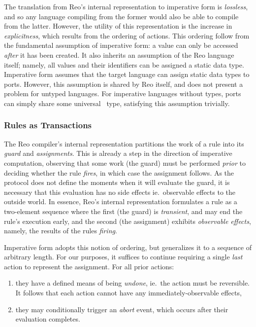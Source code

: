 The translation from Reo's internal representation to imperative form is \textit{lossless}, and so any language compiling from the former would also be able to compile from the latter. However, the utility of this representation is the increase in \textit{explicitness}, which results from the ordering of actions. This ordering follow from the fundamental assumption of imperative form: a value can only be accessed \textit{after} it has been created. It also inherits an assumption of the Reo language itself; namely, all values and their identifiers can be assigned a static data type. Imperative form assumes that the target language can assign static data types to ports. However, this assumption is shared by Reo itself, and does not present a problem for untyped languages. For imperative languages without types, ports can simply share some universal~ type, satisfying this assumption trivially.

\subsubsection{Rules as Transactions}

The Reo compiler's internal representation partitions the work of a rule into its \textit{guard} and \textit{assignments}. This is already a step in the direction of imperative computation, observing that some work (the guard) must be performed \textit{prior} to deciding whether the rule \textit{fires}, in which case the assignment follows. As the protocol does not define the moments when it will evaluate the guard, it is necessary that this evaluation has no side effects ie.\ observable effects to the outside world. In essence, Reo's internal representation formulates a rule as a two-element sequence where the first (the guard) is \textit{transient}, and may end the rule's execution early, and the second (the assignment) exhibits \textit{observable effects}, namely, the results of the rules \textit{firing}.

Imperative form adopts this notion of ordering, but generalizes it to a sequence of arbitrary length. For our purposes, it suffices to continue requiring a single \textit{last} action to represent the assignment. For all prior actions:
\begin{enumerate}
	\item they have a defined means of being \textit{undone}, ie.\ the action must be reversible. It follows that each action cannot have any immediately-observable effects,
	\item they may conditionally trigger an \textit{abort} event, which occurs after their evaluation completes.
\end{enumerate}

